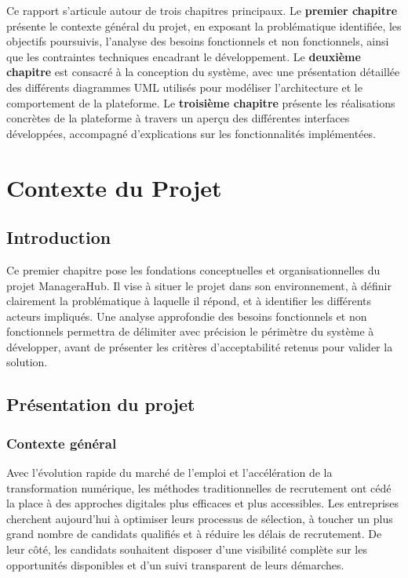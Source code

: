 \documentclass[12pt,a4paper]{report}
\begin{document}
Ce rapport s'articule autour de trois chapitres principaux. Le \textbf{premier chapitre} présente le contexte général du projet, en exposant la problématique identifiée, les objectifs poursuivis, l'analyse des besoins fonctionnels et non fonctionnels, ainsi que les contraintes techniques encadrant le développement. Le \textbf{deuxième chapitre} est consacré à la conception du système, avec une présentation détaillée des différents diagrammes UML utilisés pour modéliser l'architecture et le comportement de la plateforme. Le \textbf{troisième chapitre} présente les réalisations concrètes de la plateforme à travers un aperçu des différentes interfaces développées, accompagné d'explications sur les fonctionnalités implémentées.

\chapter{Contexte du Projet}

\section*{Introduction}

Ce premier chapitre pose les fondations conceptuelles et organisationnelles du projet ManageraHub. Il vise à situer le projet dans son environnement, à définir clairement la problématique à laquelle il répond, et à identifier les différents acteurs impliqués. Une analyse approfondie des besoins fonctionnels et non fonctionnels permettra de délimiter avec précision le périmètre du système à développer, avant de présenter les critères d'acceptabilité retenus pour valider la solution.

\section{Présentation du projet}

\subsection{Contexte général}

Avec l'évolution rapide du marché de l'emploi et l'accélération de la transformation numérique, les méthodes traditionnelles de recrutement ont cédé la place à des approches digitales plus efficaces et plus accessibles. Les entreprises cherchent aujourd'hui à optimiser leurs processus de sélection, à toucher un plus grand nombre de candidats qualifiés et à réduire les délais de recrutement. De leur côté, les candidats souhaitent disposer d'une visibilité complète sur les opportunités disponibles et d'un suivi transparent de leurs démarches.
\end{document}
